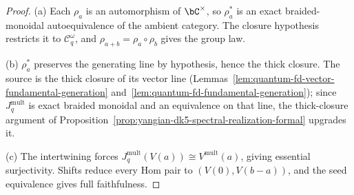 \begin{proof}
\textup{(a)}
Each \(\rho_a\) is an automorphism of \(\bC^\times\), so \(\rho_a^*\)
is an exact braided-monoidal autoequivalence of the ambient category.
The closure hypothesis restricts it to \(\mathcal C_q^\omega\), and
\(\rho_{a+b}=\rho_a\circ\rho_b\) gives the group law.

\textup{(b)}
\(\rho_a^*\) preserves the generating line by hypothesis, hence the
thick closure.  The source is the thick closure of its vector line
(Lemmas~\ref{lem:quantum-fd-vector-fundamental-generation}
and~\ref{lem:quantum-fd-fundamental-generation}); since
\(J_q^{\mathrm{mult}}\) is exact braided monoidal and an equivalence
on that line, the thick-closure argument of
Proposition~\ref{prop:yangian-dk5-spectral-realization-formal}
upgrades it.

\textup{(c)}
The intertwining forces
\(J_q^{\mathrm{mult}}(V(a))\cong V^{\mathrm{mult}}(a)\), giving
essential surjectivity.  Shifts reduce every Hom pair to
\((V(0),V(b-a))\), and the seed equivalence gives full faithfulness.
\end{proof}

